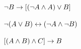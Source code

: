\begin{compactlist}
\item $\neg B \rightarrow [(\neg A \wedge A) \vee B]$\vspace{.5ex} 

%

\item $\neg(A \vee B) \leftrightarrow (\neg A \wedge \neg B)$ \vspace{.5ex}

%

\item $[(A \wedge B) \wedge C] \rightarrow B$\vspace{.5ex}							
%
%
%


\end{compactlist}
